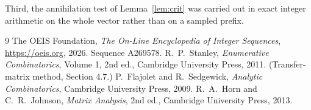 \documentclass[11pt,a4paper]{article}
\theoremstyle{plain}
\theoremstyle{definition}
\begin{document}
Third, the annihilation test of Lemma~\ref{lem:crit} was carried out in exact integer
arithmetic on the whole vector rather than on a sampled prefix.

\begin{thebibliography}{9}
 The OEIS Foundation, \emph{The On-Line Encyclopedia of Integer
Sequences}, \url{https://oeis.org}, 2026. Sequence A269578.
 R.~P.~Stanley, \emph{Enumerative Combinatorics}, Volume 1, 2nd ed.,
Cambridge University Press, 2011. (Transfer-matrix method, Section 4.7.)
 P.~Flajolet and R.~Sedgewick, \emph{Analytic Combinatorics}, Cambridge
University Press, 2009.
 R.~A.~Horn and C.~R.~Johnson, \emph{Matrix Analysis}, 2nd ed., Cambridge
University Press, 2013.
\end{thebibliography}
\end{document}
